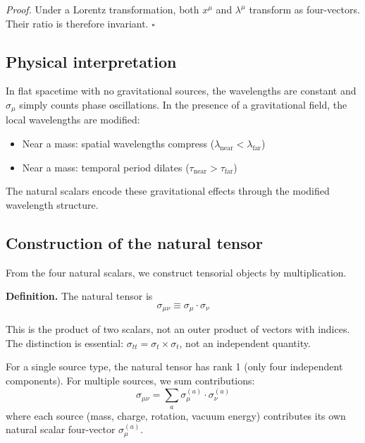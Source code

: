 \documentclass[11pt,a4paper]{article}
\theoremstyle{definition}
\theoremstyle{remark}
\begin{document}
	\emph{Proof.} Under a Lorentz transformation, both $x^\mu$ and $\lambda^\mu$ transform as four-vectors. Their ratio is therefore invariant. $\square$
	
	\subsection{Physical interpretation}
	
	In flat spacetime with no gravitational sources, the wavelengths are constant and $\sigma_\mu$ simply counts phase oscillations. In the presence of a gravitational field, the local wavelengths are modified:
	\begin{itemize}
		\item Near a mass: spatial wavelengths compress ($\lambda_{\text{near}} < \lambda_{\text{far}}$)
		\item Near a mass: temporal period dilates ($\tau_{\text{near}} > \tau_{\text{far}}$)
	\end{itemize}
	
	The natural scalars encode these gravitational effects through the modified wavelength structure.
	
	\subsection{Construction of the natural tensor}
	
	From the four natural scalars, we construct tensorial objects by multiplication.
	
	\textbf{Definition.} The natural tensor is
	\begin{equation}
		\sigma_{\mu\nu} \equiv \sigma_\mu \cdot \sigma_\nu
		\label{eq:natural_tensor}
	\end{equation}
	
	This is the product of two scalars, not an outer product of vectors with indices. The distinction is essential: $\sigma_{tt} = \sigma_t \times \sigma_t$, not an independent quantity.
	
	For a single source type, the natural tensor has rank 1 (only four independent components). For multiple sources, we sum contributions:
	\begin{equation}
		\sigma_{\mu\nu} = \sum_{a} \sigma^{(a)}_\mu \cdot \sigma^{(a)}_\nu
		\label{eq:natural_tensor_sum}
	\end{equation}
	where each source (mass, charge, rotation, vacuum energy) contributes its own natural scalar four-vector $\sigma^{(a)}_\mu$.
	
\end{document}
